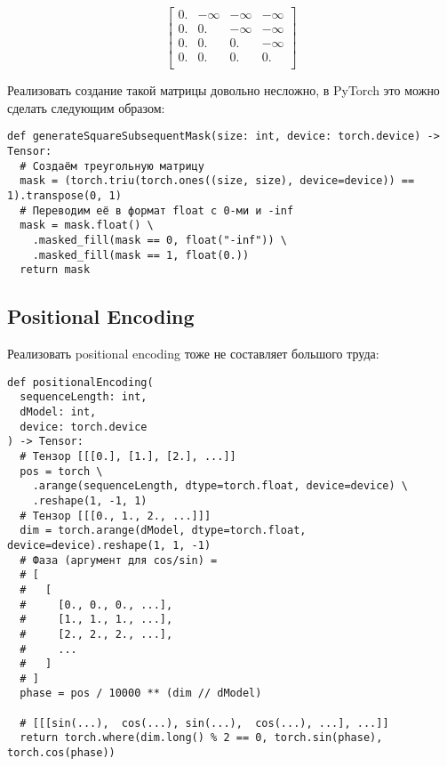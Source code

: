 \begin{equation}\label{mask-matrix}%
  \begin{bmatrix}
    0. & -\infty & -\infty & -\infty \\
    0. & 0. & -\infty & -\infty \\ 
    0. & 0. & 0. & -\infty \\ 
    0. & 0. & 0. & 0. \\ 
  \end{bmatrix}  
\end{equation}

Реализовать создание такой матрицы довольно несложно, в PyTorch это можно сделать следующим образом:

\begin{verbatim}
def generateSquareSubsequentMask(size: int, device: torch.device) -> Tensor:
  # Создаём треугольную матрицу
  mask = (torch.triu(torch.ones((size, size), device=device)) == 1).transpose(0, 1)
  # Переводим её в формат float с 0-ми и -inf
  mask = mask.float() \
    .masked_fill(mask == 0, float("-inf")) \
    .masked_fill(mask == 1, float(0.))
  return mask
\end{verbatim}


\subsection{Positional Encoding}


Реализовать positional encoding тоже не составляет большого труда:

\begin{verbatim}
def positionalEncoding(
  sequenceLength: int,
  dModel: int,
  device: torch.device
) -> Tensor:
  # Тензор [[[0.], [1.], [2.], ...]]
  pos = torch \
    .arange(sequenceLength, dtype=torch.float, device=device) \
    .reshape(1, -1, 1)
  # Тензор [[[0., 1., 2., ...]]]
  dim = torch.arange(dModel, dtype=torch.float, device=device).reshape(1, 1, -1)
  # Фаза (аргумент для cos/sin) =
  # [
  #   [
  #     [0., 0., 0., ...],
  #     [1., 1., 1., ...],
  #     [2., 2., 2., ...],
  #     ...
  #   ]
  # ]
  phase = pos / 10000 ** (dim // dModel)

  # [[[sin(...),  cos(...), sin(...),  cos(...), ...], ...]]
  return torch.where(dim.long() % 2 == 0, torch.sin(phase), torch.cos(phase))
\end{verbatim}


